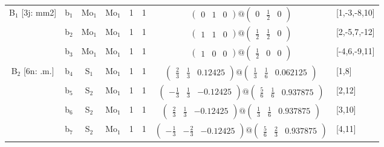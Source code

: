 \documentclass[fleqn,10pt,landscape]{article}
\begin{document}
\begin{itemize}
\begin{center}
\begin{longtable}{cc|cc|c|c|c|l}
B$_{1}$ [3j: mm2] & b$_{1}$ & Mo$_{1}$ & Mo$_{1}$ & 1 & 1 & $\begin{pmatrix} 0 & 1 & 0 \end{pmatrix}@\begin{pmatrix} 0 & \frac{1}{2} & 0 \end{pmatrix}$ & [1,-3,-8,10] \\
& b$_{2}$ & Mo$_{1}$ & Mo$_{1}$ & 1 & 1 & $\begin{pmatrix} 1 & 1 & 0 \end{pmatrix}@\begin{pmatrix} \frac{1}{2} & \frac{1}{2} & 0 \end{pmatrix}$ & [2,-5,7,-12] \\
& b$_{3}$ & Mo$_{1}$ & Mo$_{1}$ & 1 & 1 & $\begin{pmatrix} 1 & 0 & 0 \end{pmatrix}@\begin{pmatrix} \frac{1}{2} & 0 & 0 \end{pmatrix}$ & [-4,6,-9,11] \\ \hline
B$_{2}$ [6n: .m.] & b$_{4}$ & S$_{1}$ & Mo$_{1}$ & 1 & 1 & $\begin{pmatrix} \frac{2}{3} & \frac{1}{3} & 0.12425 \end{pmatrix}@\begin{pmatrix} \frac{1}{3} & \frac{1}{6} & 0.062125 \end{pmatrix}$ & [1,8] \\
& b$_{5}$ & S$_{2}$ & Mo$_{1}$ & 1 & 1 & $\begin{pmatrix} - \frac{1}{3} & \frac{1}{3} & -0.12425 \end{pmatrix}@\begin{pmatrix} \frac{5}{6} & \frac{1}{6} & 0.937875 \end{pmatrix}$ & [2,12] \\
& b$_{6}$ & S$_{2}$ & Mo$_{1}$ & 1 & 1 & $\begin{pmatrix} \frac{2}{3} & \frac{1}{3} & -0.12425 \end{pmatrix}@\begin{pmatrix} \frac{1}{3} & \frac{1}{6} & 0.937875 \end{pmatrix}$ & [3,10] \\
& b$_{7}$ & S$_{2}$ & Mo$_{1}$ & 1 & 1 & $\begin{pmatrix} - \frac{1}{3} & - \frac{2}{3} & -0.12425 \end{pmatrix}@\begin{pmatrix} \frac{5}{6} & \frac{2}{3} & 0.937875 \end{pmatrix}$ & [4,11] \\

\end{longtable}
\end{center}
\end{itemize}
\end{document}
